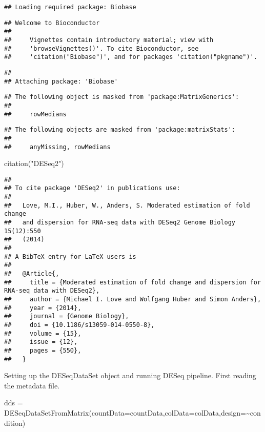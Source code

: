 \documentclass[
]{article}
\newenvironment{Shaded}{\begin{snugshade}}{\end{snugshade}}
\newcommand{\AttributeTok}[1]{\textcolor[rgb]{0.77,0.63,0.00}{#1}}
\newcommand{\FunctionTok}[1]{\textcolor[rgb]{0.00,0.00,0.00}{#1}}
\newcommand{\NormalTok}[1]{#1}
\newcommand{\OtherTok}[1]{\textcolor[rgb]{0.56,0.35,0.01}{#1}}
\newcommand{\SpecialCharTok}[1]{\textcolor[rgb]{0.00,0.00,0.00}{#1}}
\newcommand{\StringTok}[1]{\textcolor[rgb]{0.31,0.60,0.02}{#1}}
\begin{document}
\begin{verbatim}
## Loading required package: Biobase
\end{verbatim}

\begin{verbatim}
## Welcome to Bioconductor
## 
##     Vignettes contain introductory material; view with
##     'browseVignettes()'. To cite Bioconductor, see
##     'citation("Biobase")', and for packages 'citation("pkgname")'.
\end{verbatim}

\begin{verbatim}
## 
## Attaching package: 'Biobase'
\end{verbatim}

\begin{verbatim}
## The following object is masked from 'package:MatrixGenerics':
## 
##     rowMedians
\end{verbatim}

\begin{verbatim}
## The following objects are masked from 'package:matrixStats':
## 
##     anyMissing, rowMedians
\end{verbatim}

\begin{Shaded}
\begin{Highlighting}[]
\FunctionTok{citation}\NormalTok{(}\StringTok{"DESeq2"}\NormalTok{)}
\end{Highlighting}
\end{Shaded}

\begin{verbatim}
## 
## To cite package 'DESeq2' in publications use:
## 
##   Love, M.I., Huber, W., Anders, S. Moderated estimation of fold change
##   and dispersion for RNA-seq data with DESeq2 Genome Biology 15(12):550
##   (2014)
## 
## A BibTeX entry for LaTeX users is
## 
##   @Article{,
##     title = {Moderated estimation of fold change and dispersion for RNA-seq data with DESeq2},
##     author = {Michael I. Love and Wolfgang Huber and Simon Anders},
##     year = {2014},
##     journal = {Genome Biology},
##     doi = {10.1186/s13059-014-0550-8},
##     volume = {15},
##     issue = {12},
##     pages = {550},
##   }
\end{verbatim}

Setting up the DESeqDataSet object and running DESeq pipeline. First
reading the metadata file.

\begin{Shaded}
\begin{Highlighting}[]
\NormalTok{dds }\OtherTok{=} \FunctionTok{DESeqDataSetFromMatrix}\NormalTok{(}\AttributeTok{countData=}\NormalTok{countData,}\AttributeTok{colData=}\NormalTok{colData,}\AttributeTok{design=}\SpecialCharTok{\textasciitilde{}}\NormalTok{condition)}
\end{Highlighting}
\end{Shaded}
\end{document}
